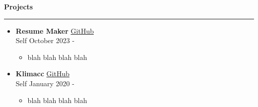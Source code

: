 \textbf{Projects} 
 \par\noindent\rule{\textwidth}{0.2pt} 
 \begin{itemize} 
\item {\textbf{Resume Maker} \hfill \faGithub \hspace{.5pt} \href{www.google.com}{GitHub} \\ 
 Self \hfill {October 2023 - } 
 { 
 \begin{itemize} 
 \item {blah blah blah blah} 
 \end{itemize} 
 }} 
\item {\textbf{Klimacc} \hfill \faGithub \hspace{.5pt} \href{www.google.com}{GitHub} \\ 
 Self \hfill {January 2020 - } 
 { 
 \begin{itemize} 
 \item {blah blah blah blah} 
 \end{itemize} 
 }} 
\end{itemize}
